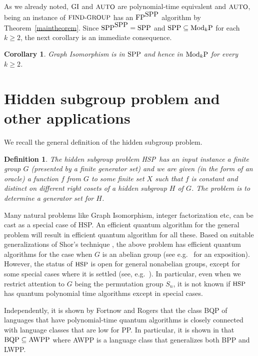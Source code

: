 \documentclass{article}
\newtheorem{corollary}[theorem]{Corollary}
\newtheorem{definition}[theorem]{Definition}
\newcommand{\FP}{\mbox{\rm FP}}
\newcommand{\ModkP}{\mbox{\rm Mod$_k$P}}
\newcommand{\SPP}{\mbox{\rm SPP}}
\newcommand{\BQP}{\mbox{\rm BQP}}
\newcommand{\AWPP}{\mbox{\rm AWPP}}
\newcommand{\AUTO}{\mbox{\small\rm AUTO}}
\newcommand{\FINDGROUP}{\mbox{\small\rm FIND{-}GROUP}}
\newcommand{\HSP}{\mbox{\small\rm HSP}}
\newcommand{\GI}{{\rm{GI}}}
\begin{document}
As we already noted, $\GI$ and $\AUTO$ are polynomial-time equivalent
and $\AUTO$, being an instance of $\FINDGROUP$ has an $\FP^{\SPP}$
algorithm by Theorem~\ref{maintheorem}. Since $\SPP^{\SPP}=\SPP$ and
$\SPP\subseteq\ModkP$ for each $k\geq 2$, the next corollary is an
immediate consequence.

\begin{corollary}
  Graph Isomorphism is in $\SPP$ and hence in $\ModkP$ for every
  $k\geq 2$.
\end{corollary}

\section{Hidden subgroup problem and {other applications}}

We recall the general definition of the hidden subgroup problem.

\begin{definition}\label{hsp}
  The {\em hidden subgroup problem} \HSP\ has an input instance a
  finite group $G$ (presented by a finite generator set) and we are
  given (in the form of an oracle) a function $f$ from $G$ to some
  finite set $X$ such that $f$ is constant and distinct on different
  right cosets of a hidden subgroup $H$ of $G$. The problem is to
  determine a generator set for $H$.
\end{definition}

Many natural problems like Graph Isomorphism, integer factorization
etc, can be cast as a special case of \HSP. An efficient quantum
algorithm for the general problem will result in efficient quantum
algorithm for all these. Based on suitable generalizations of Shor's
technique \cite{shor97polynomialtime}, the above problem has efficient
quantum algorithms for the case when $G$ is an abelian group (see
e.g.~\cite{moscaphd} for an exposition).  However, the status of
$\HSP$ is open for general nonabelian groups, except for some special
cases where it is settled (see, e.g.\ 
\cite{hallgren00normal,ivanyos01efficient}). In particular, even when
we restrict attention to $G$ being the permutation group $S_n$, it is
not known if $\HSP$ has quantum polynomial time algorithms except in
special cases.

Independently, it is shown by Fortnow and Rogers \cite{fortnow98complexity} 
that the class BQP of languages that have polynomial-time quantum algorithms is
closely connected with language classes that are low for PP. In
particular, it is shown in \cite{fortnow98complexity} that $\BQP\subseteq\AWPP$
where AWPP is a language class that generalizes both BPP and LWPP.
\end{document}
